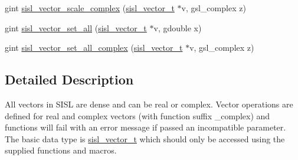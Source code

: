 \begin{DoxyCompactItemize}
gint \hyperlink{group__vector_ga57a386cd94671f45ee0ad4d2d0f6b863}{sisl\-\_\-vector\-\_\-scale\-\_\-complex} (\hyperlink{group__vector_gacbac585492f5005f05f0c0b8463039be}{sisl\-\_\-vector\-\_\-t} $\ast$v, gsl\-\_\-complex z)
\item 
gint \hyperlink{group__vector_ga4c687e753645759cf09ed9c8b63ae49b}{sisl\-\_\-vector\-\_\-set\-\_\-all} (\hyperlink{group__vector_gacbac585492f5005f05f0c0b8463039be}{sisl\-\_\-vector\-\_\-t} $\ast$v, gdouble x)
\item 
gint \hyperlink{group__vector_ga033227a0e85218e8bda5aeacf7ec539e}{sisl\-\_\-vector\-\_\-set\-\_\-all\-\_\-complex} (\hyperlink{group__vector_gacbac585492f5005f05f0c0b8463039be}{sisl\-\_\-vector\-\_\-t} $\ast$v, gsl\-\_\-complex z)
\end{DoxyCompactItemize}


\subsection{Detailed Description}
All vectors in S\-I\-S\-L are dense and can be real or complex. Vector operations are defined for real and complex vectors (with function suffix \-\_\-complex) and functions will fail with an error message if passed an incompatible parameter. The basic data type is \hyperlink{group__vector_gacbac585492f5005f05f0c0b8463039be}{sisl\-\_\-vector\-\_\-t} which should only be accessed using the supplied functions and macros. 

